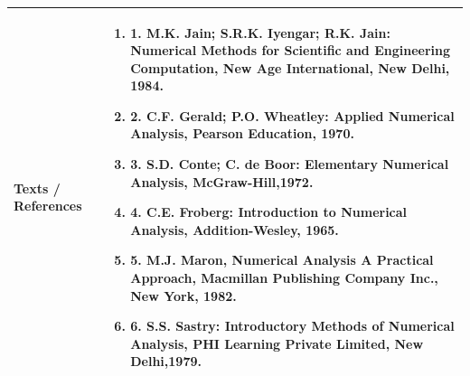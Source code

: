 \documentclass[11pt,a4paper]{article}
\begin{document}
\vspace{8pt}
\renewcommand{\arraystretch}{1.3}
\begin{tabularx}{\textwidth}{|p{3.2cm}|X|}
\hline
\textbf{Texts / References} & \begin{enumerate}[leftmargin=*,noitemsep,topsep=2pt]  \item 1. M.K. Jain; S.R.K. Iyengar; R.K. Jain: Numerical Methods for Scientific and Engineering  Computation, New Age International, New Delhi, 1984.  \item 2. C.F. Gerald; P.O. Wheatley: Applied Numerical Analysis, Pearson Education, 1970.  \item 3. S.D. Conte; C. de Boor: Elementary Numerical Analysis, McGraw-Hill,1972.  \item 4. C.E. Froberg: Introduction to Numerical Analysis, Addition-Wesley, 1965.  \item 5. M.J. Maron, Numerical Analysis A Practical Approach, Macmillan Publishing Company Inc.,  New York, 1982.  \item 6. S.S. Sastry: Introductory Methods of Numerical Analysis, PHI Learning Private Limited, New  Delhi,1979.\end{enumerate} \\
\hline
\end{tabularx}
\clearpage
\end{document}

